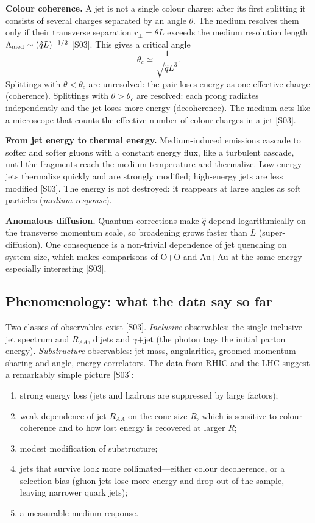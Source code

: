 \documentclass[11pt,letterpaper]{article}
\newcommand{\RAA}{R_{AA}}
\begin{document}
\textbf{Colour coherence.} A jet is not a single colour charge: after its first splitting it consists of several
charges separated by an angle $\theta$. The medium resolves them only if their transverse separation
$r_\perp=\theta L$ exceeds the medium resolution length $\Lambda_{\rm med}\sim(\hat qL)^{-1/2}$ [S03]. This gives a
critical angle
\begin{equation}
\theta_c\simeq\frac{1}{\sqrt{\hat q L^3}} .
\end{equation}
Splittings with $\theta<\theta_c$ are unresolved: the pair loses energy as one effective charge (coherence). Splittings with
$\theta>\theta_c$ are resolved: each prong radiates independently and the jet loses more energy (decoherence). The
medium acts like a microscope that counts the effective number of colour charges in a jet [S03].

\textbf{From jet energy to thermal energy.} Medium-induced emissions cascade to softer and softer gluons with a constant
energy flux, like a turbulent cascade, until the fragments reach the medium temperature and thermalize. Low-energy jets
thermalize quickly and are strongly modified; high-energy jets are less modified [S03]. The energy is not destroyed: it
reappears at large angles as soft particles (\emph{medium response}).

\textbf{Anomalous diffusion.} Quantum corrections make $\hat q$ depend logarithmically on the transverse momentum
scale, so broadening grows faster than $L$ (super-diffusion). One consequence is a non-trivial dependence of jet
quenching on system size, which makes comparisons of O+O and Au+Au at the same energy especially interesting [S03].

\subsection{Phenomenology: what the data say so far}
Two classes of observables exist [S03]. \emph{Inclusive} observables: the single-inclusive jet spectrum and $\RAA$,
dijets and $\gamma$+jet (the photon tags the initial parton energy). \emph{Substructure} observables: jet mass,
angularities, groomed momentum sharing and angle, energy correlators. The data from RHIC and the LHC suggest a
remarkably simple picture [S03]:
\begin{enumerate}
\item strong energy loss (jets and hadrons are suppressed by large factors);
\item weak dependence of jet $\RAA$ on the cone size $R$, which is sensitive to colour coherence and to how lost energy is recovered at larger $R$;
\item modest modification of substructure;
\item jets that survive look more collimated---either colour decoherence, or a selection bias (gluon jets lose more
energy and drop out of the sample, leaving narrower quark jets);
\item a measurable medium response.
\end{enumerate}
\end{document}
